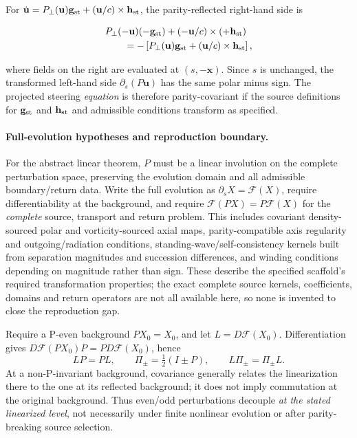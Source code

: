 \documentclass[11pt]{article}
\theoremstyle{definition}
\begin{document}
For $\dot{\mathbf u}=P_\perp(\mathbf u)\mathbf g_{\rm st}
+(\mathbf u/c)\times\mathbf h_{\rm st}$, the parity-reflected right-hand
side is

\begin{align}
	&P_\perp(-\mathbf u)(-\mathbf g_{\rm st})
	+(-\mathbf u/c)\times(+\mathbf h_{\rm st})\nonumber\\
	&\qquad=-\left[P_\perp(\mathbf u)\mathbf g_{\rm st}
	+(\mathbf u/c)\times\mathbf h_{\rm st}\right],
	\label{eq:parity_steering_check}
\end{align}

where fields on the right are evaluated at $(s,-\mathbf x)$.  Since $s$
is unchanged, the transformed left-hand side $\partial_s(P\mathbf u)$
has the same polar minus sign.  The projected steering \emph{equation} is
therefore parity-covariant if the source definitions for $\mathbf g_{\rm st}$
and $\mathbf h_{\rm st}$ and admissible conditions transform as specified.

\paragraph{Full-evolution hypotheses and reproduction boundary.}
For the abstract linear theorem, $P$ must be a linear involution on the
complete perturbation space, preserving the evolution domain and all
admissible boundary/return data.  Write the full evolution as
$\partial_sX=\mathcal F(X)$, require differentiability at the background,
and require $\mathcal F(PX)=P\mathcal F(X)$ for the \emph{complete} source,
transport and return problem.  This includes covariant density-sourced
polar and vorticity-sourced axial maps, parity-compatible axis regularity
and outgoing/radiation conditions, standing-wave/self-consistency kernels
built from separation magnitudes and succession differences, and winding
conditions depending on magnitude rather than sign.  These describe the
specified scaffold's required transformation properties; the exact complete
source kernels, coefficients, domains and return operators are not all
available here, so none is invented to close the reproduction gap.

Require a P-even background $PX_0=X_0$, and let $L=D\mathcal F(X_0)$.
Differentiation gives $D\mathcal F(PX_0)P=P D\mathcal F(X_0)$, hence
\begin{equation}
 LP=PL,\qquad
 \Pi_\pm=\tfrac12(I\pm P),\qquad L\Pi_\pm=\Pi_\pm L.
 \label{eq:parity_linear_block_proof}
\end{equation}
At a non-P-invariant background, covariance generally relates the
linearization there to the one at its reflected background; it does not
imply commutation at the original background.  Thus even/odd perturbations
decouple \emph{at the stated linearized level}, not
necessarily under finite nonlinear evolution or after parity-breaking source
selection.
\end{document}
